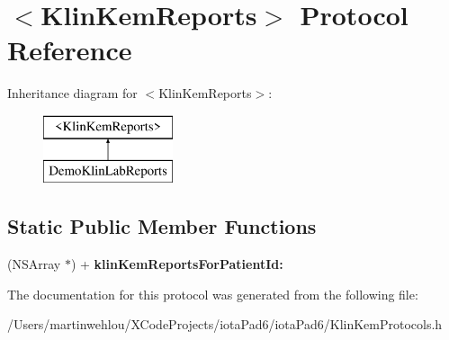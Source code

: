 \hypertarget{protocol_klin_kem_reports-p}{
\section{$<$KlinKemReports$>$ Protocol Reference}
\label{protocol_klin_kem_reports-p}
}
Inheritance diagram for $<$KlinKemReports$>$:\begin{figure}[H]
\begin{center}
\leavevmode
\includegraphics[height=2.000000cm]{protocol_klin_kem_reports-p}
\end{center}
\end{figure}
\subsection*{Static Public Member Functions}
\begin{DoxyCompactItemize}
\item 
\hypertarget{protocol_klin_kem_reports-p_aa0c9823a724d493c2c6aab18afd8fc9a}{
(NSArray $\ast$) + {\bfseries klinKemReportsForPatientId:}}
\label{protocol_klin_kem_reports-p_aa0c9823a724d493c2c6aab18afd8fc9a}

\end{DoxyCompactItemize}


The documentation for this protocol was generated from the following file:\begin{DoxyCompactItemize}
\item 
/Users/martinwehlou/XCodeProjects/iotaPad6/iotaPad6/KlinKemProtocols.h\end{DoxyCompactItemize}
